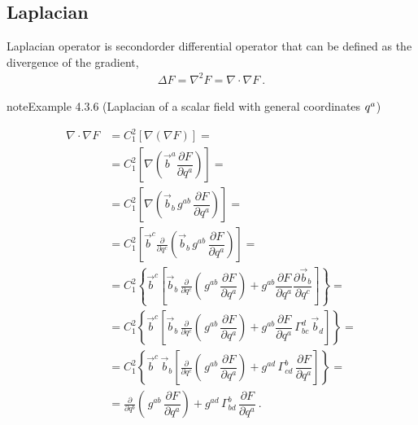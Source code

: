 \documentclass[letterpaper,10pt,english]{jupyterBook}
\begin{document}
\subsection{Laplacian}
\label{\detokenize{ch/tensor-algebra-calculus/calculus-euclidean:laplacian}}\label{\detokenize{ch/tensor-algebra-calculus/calculus-euclidean:tensor-calculus-differential-operators-laplacian}}
\sphinxAtStartPar
Laplacian operator is second\sphinxhyphen{}order differential operator that can be defined as the divergence of the gradient,
\begin{equation*}
\begin{split}\Delta F = \nabla^2 F = \nabla \cdot \nabla F \ .\end{split}
\end{equation*}\label{ch/tensor-algebra-calculus/calculus-euclidean:example-9}
\begin{sphinxadmonition}{note}{Example 4.3.6 (Laplacian of a scalar field \sphinxhyphen{} with general coordinates \protect\(q^a\protect\))}


\begin{equation*}
\begin{split}
\nabla \cdot \nabla F
  & = C_{1}^2 \left[ \nabla \left( \nabla F \right) \right] = \\
  & = C_{1}^2 \left[ \nabla \left( \vec{b}^a \dfrac{\partial F}{\partial q^a} \right) \right] = \\
  & = C_{1}^2 \left[ \nabla \left( \vec{b}_b \, g^{ab} \, \dfrac{\partial F}{\partial q^a} \right) \right] = \\
  & = C_{1}^2 \left[ \vec{b}^c \frac{\partial}{\partial q^c} \left( \vec{b}_b \, g^{ab} \, \dfrac{\partial F}{\partial q^a} \right) \right] = \\
  & = C_{1}^2 \left\{ \vec{b}^c \left[ \vec{b}_b \, \frac{\partial}{\partial q^c} \left( \, g^{ab} \, \dfrac{\partial F}{\partial q^a} \right) + g^{ab} \dfrac{\partial F}{\partial q^a} \dfrac{\partial \vec{b}_b}{\partial q^c} \right] \right\} = \\
  & = C_{1}^2 \left\{ \vec{b}^c \left[ \vec{b}_b \, \frac{\partial}{\partial q^c} \left( \, g^{ab} \, \dfrac{\partial F}{\partial q^a} \right) + g^{ab} \dfrac{\partial F}{\partial q^a} \, \Gamma_{bc}^d \, \vec{b}_d \right] \right \} = \\
  & = C_{1}^2 \left\{ \vec{b}^c \, \vec{b}_b \left[ \frac{\partial}{\partial q^c} \left( \, g^{ab} \, \dfrac{\partial F}{\partial q^a} \right) + g^{ad} \, \Gamma_{cd}^b \, \dfrac{\partial F}{\partial q^a} \right] \right \} = \\
  & = \frac{\partial}{\partial q^b} \left( \, g^{ab} \, \dfrac{\partial F}{\partial q^a} \right) + g^{ad} \, \Gamma_{bd}^b \, \dfrac{\partial F}{\partial q^a} \ .
\end{split}
\end{equation*}\end{sphinxadmonition}
\end{document}
